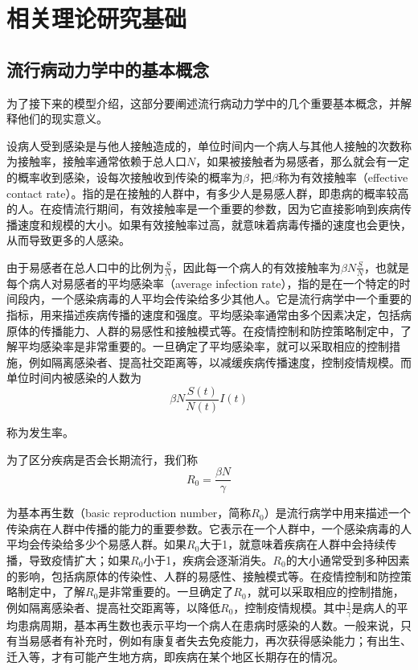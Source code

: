 \clearpage
\section{相关理论研究基础}
\subsection{流行病动力学中的基本概念}
为了接下来的模型介绍，这部分要阐述流行病动力学中的几个重要基本概念，并解释他们的现实意义。

设病人受到感染是与他人接触造成的，单位时间内一个病人与其他人接触的次数称为接触率，接触率通常依赖于总人口$N$，如果被接触者为易感者，那么就会有一定的概率收到感染，设每次接触收到传染的概率为$\beta$，把$\beta$称为有效接触率（effective contact rate）。指的是在接触的人群中，有多少人是易感人群，即患病的概率较高的人。在疫情流行期间，有效接触率是一个重要的参数，因为它直接影响到疾病传播速度和规模的大小。如果有效接触率过高，就意味着病毒传播的速度也会更快，从而导致更多的人感染。

由于易感者在总人口中的比例为$\frac{S}{N}$，因此每一个病人的有效接触率为$\beta N \frac{S}{N}$，也就是每个病人对易感者的平均感染率（average infection rate），指的是在一个特定的时间段内，一个感染病毒的人平均会传染给多少其他人。它是流行病学中一个重要的指标，用来描述疾病传播的速度和强度。平均感染率通常由多个因素决定，包括病原体的传播能力、人群的易感性和接触模式等。在疫情控制和防控策略制定中，了解平均感染率是非常重要的。一旦确定了平均感染率，就可以采取相应的控制措施，例如隔离感染者、提高社交距离等，以减缓疾病传播速度，控制疫情规模。而单位时间内被感染的人数为
$$\beta N \frac{S(t)}{N(t)} I(t)$$

称为发生率。

为了区分疾病是否会长期流行，我们称
$$R_0=\frac{\beta N}{\gamma}$$

为基本再生数（basic reproduction number，简称$R_0$）是流行病学中用来描述一个传染病在人群中传播的能力的重要参数。它表示在一个人群中，一个感染病毒的人平均会传染给多少个易感人群。如果$R_0$大于1，就意味着疾病在人群中会持续传播，导致疫情扩大；如果$R_0$小于1，疾病会逐渐消失。$R_0$的大小通常受到多种因素的影响，包括病原体的传染性、人群的易感性、接触模式等。在疫情控制和防控策略制定中，了解$R_0$是非常重要的。一旦确定了$R_0$，就可以采取相应的控制措施，例如隔离感染者、提高社交距离等，以降低$R_0$，控制疫情规模。其中$\frac{1}{\gamma}$是病人的平均患病周期，基本再生数也表示平均一个病人在患病时感染的人数。一般来说，只有当易感者有补充时，例如有康复者失去免疫能力，再次获得感染能力；有出生、迁入等，才有可能产生地方病，即疾病在某个地区长期存在的情况。

